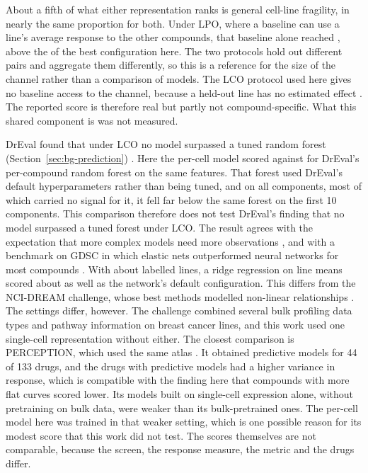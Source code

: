 About a fifth of what either representation ranks is
general cell-line fragility, in nearly the same proportion for both. Under LPO, where a
baseline can use a line's average response to the other compounds, that baseline alone reached
\LpoLineMean{}, above the \SpBest{} of the best configuration here. The two protocols hold out different
pairs and aggregate them differently, so this is a reference for the size of the channel rather than a
comparison of models. The LCO protocol used here gives no baseline access to the channel, because a held-out line has no
estimated effect \cite{dreval}. The reported score is therefore real but partly not compound-specific. What this shared component is
was not measured.

DrEval found that under LCO no model surpassed a tuned random forest (Section~\ref{sec:bg-prediction})
\cite{dreval}. Here the per-cell model scored \DrMlpNorm{} against
\DrRfPcaNorm{} for DrEval's per-compound random forest on the same features. That forest
used DrEval's default hyperparameters rather than being tuned, and on all \NPca{} components, most of
which carried no signal for it, it fell far below the same forest on the first 10 components.
This comparison therefore does not test DrEval's finding that no model surpassed a tuned forest under
LCO. The result agrees with the expectation that more
complex models need more observations \cite{adam2020}, and with a benchmark on GDSC in which elastic
nets outperformed neural networks for most compounds \cite{eckhart2024}. With about \NLinesCV{} labelled lines, a ridge
regression on line means scored about as well as the network's default configuration. This differs
from the NCI-DREAM challenge, whose best methods modelled non-linear relationships \cite{costello2014}. The settings differ, however. The challenge combined
several bulk profiling data types and pathway information on breast cancer lines, and this work used
one single-cell representation without either. The closest comparison is PERCEPTION, which used the
same atlas \cite{perception}. It obtained predictive models for 44 of 133 drugs, and the drugs with
predictive models had a higher variance in response, which is compatible with the finding here that
compounds with more flat curves scored lower. Its models built on single-cell expression alone, without
pretraining on bulk data, were weaker than its bulk-pretrained ones. The per-cell model here was
trained in that weaker setting, which is one possible reason for its modest score that this work did
not test. The scores themselves are not comparable, because the screen, the response measure, the
metric and the drugs differ.

